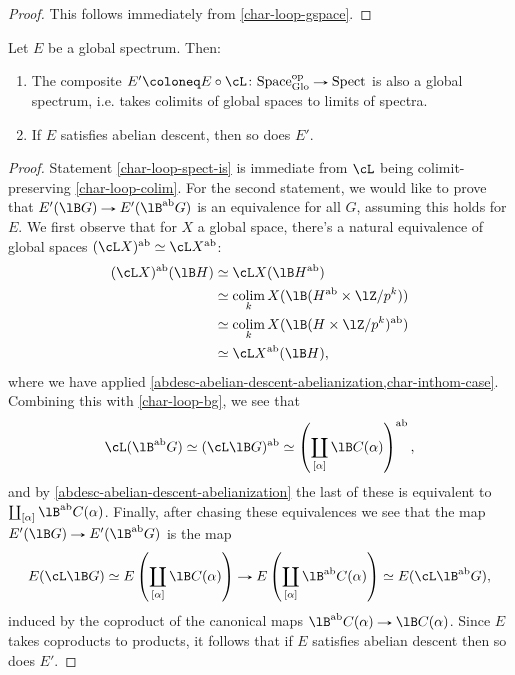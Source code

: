 \begin{proof}
  This follows immediately from \cref{char-loop-gspace}.
\end{proof}

\begin{lemma}
  \label{char-loop-spect}
  Let $E$ be a global spectrum. Then:
  \begin{enumerate}
  \item \label{char-loop-spect-is} The composite
    $E' \ce E \circ \cL \c \Space_\Glo^\op \to \Spect$ is also a
    global spectrum, i.e. takes colimits of global spaces to limits of
    spectra.
  \item \label{char-loop-spect-abdesc} If $E$ satisfies abelian
    descent, then so does $E'$.
  \end{enumerate}
\end{lemma}

\begin{proof}
  Statement \cref{char-loop-spect-is} is immediate from $\cL$ being
  colimit-preserving \cref{char-loop-colim}. For the second statement,
  we would like to prove that $E'(\lB G) \to E'(\lB^\ab G)$ is an
  equivalence for all $G$, assuming this holds for $E$. We first
  observe that for $X$ a global space, there's a natural equivalence
  of global spaces $(\cL X)^\ab \iso \cL X^\ab$:
  \begin{align*}
  (\cL X)^\ab(\lB H) &\iso
  \cL X(\lB H^\ab) \\ &\iso
  \colim_k X(\lB(H^\ab \times \lZ/p^k)) \\ &\iso
  \colim_k X(\lB(H \times \lZ/p^k)^\ab) \\ &\iso
  \cL X^\ab(\lB H),
  \end{align*}
  where we have applied
  \cref{abdesc-abelian-descent-abelianization,char-inthom-case}.
  Combining this with \cref{char-loop-bg}, we see that
  \[
  \cL(\lB^\ab G) \iso
  (\cL \lB G)^\ab \iso
  \l( \coprod_{[\alpha]} \lB C(\alpha) \r)^\ab,
  \]
  and by \cref{abdesc-abelian-descent-abelianization} the last of
  these is equivalent to $\coprod_{[\alpha]} \lB^\ab
  C(\alpha)$.
  Finally, after chasing these equivalences we see that the map
  $E'(\lB G) \to E'(\lB^\ab G)$ is the map
  \[
  E(\cL \lB G) \iso
  E \l( \coprod_{[\alpha]} \lB C(\alpha) \r) \to
  E \l( \coprod_{[\alpha]} \lB^\ab C(\alpha) \r) \iso
  E(\cL \lB^\ab G),
  \]
  induced by the coproduct of the canonical maps
  $\lB^\ab C(\alpha) \to \lB C(\alpha)$. Since $E$ takes coproducts to
  products, it follows that if $E$ satisfies abelian descent then so
  does $E'$.
\end{proof}

